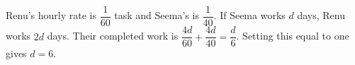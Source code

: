 Renu's hourly rate is $\dfrac{1}{60}$ task and Seema's is $\dfrac{1}{40}$. If Seema works $d$ days, Renu works $2d$ days. Their completed work is $\dfrac{4d}{60}+\dfrac{4d}{40}=\dfrac{d}{6}$. Setting this equal to one gives $\boxed{d=6}$.
